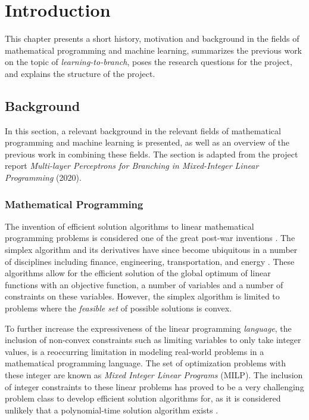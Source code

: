 \chapter{Introduction}\label{cha:introduction}
%
This chapter presents a short history, motivation and background in the fields of mathematical programming and machine learning, summarizes the previous work on the topic of \textit{learning-to-branch}, poses the research questions for the project, and explains the structure of the project.


\section{Background}

In this section, a relevant background in the relevant fields of mathematical programming and machine learning is presented, as well as an overview of the previous work in combining these fields. The section is adapted from the project report \textit{Multi-layer Perceptrons for Branching in Mixed-Integer Linear Programming }(2020). 

\subsection{Mathematical Programming}

The invention of efficient solution algorithms to linear mathematical programming problems is considered one of the great post-war inventions \cite{dantzig1983reminiscences}. The simplex algorithm and its derivatives have since become ubiquitous in a number of disciplines including finance, engineering, transportation, and energy \cite{junger2010years}. These algorithms allow for the efficient solution of the global optimum of linear functions with an objective function, a number of variables and a number of constraints on these variables. However, the simplex algorithm is limited to problems where the \textit{feasible set} of possible solutions is convex.

To further increase the expressiveness of the linear programming \textit{language}, the inclusion of non-convex constraints such as limiting variables to only take integer values, is a reoccurring limitation in modeling real-world problems in a mathematical programming language. The set of optimization problems with these integer are known as \textit{Mixed Integer Linear Programs} (\gls{MILP}). The inclusion of integer constraints to these linear problems has proved to be a very challenging problem class to develop efficient solution algorithms for, as it is considered unlikely that a polynomial-time solution algorithm exists \cite{bengio2020machine}.

